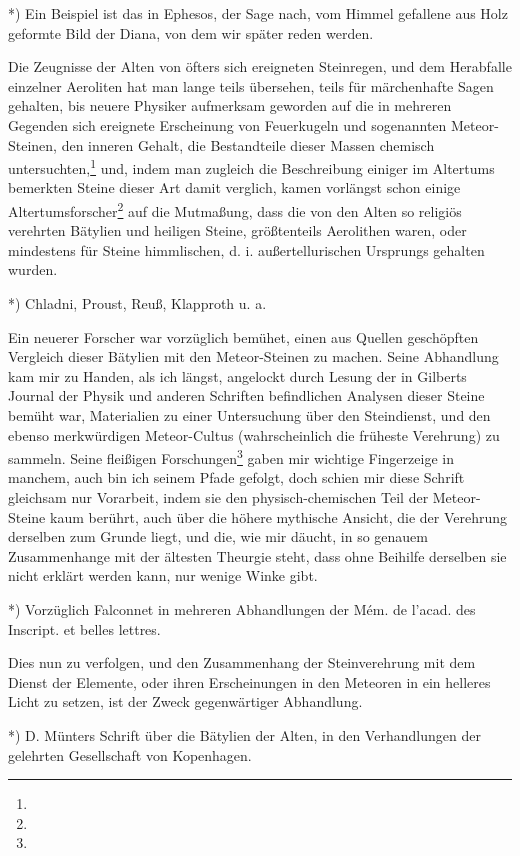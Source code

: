 \documentclass[a4paper, 11pt, oneside, polutonikogreek, german]{article}
\begin{document}
*) Ein Beispiel ist das in Ephesos, der Sage nach, vom Himmel gefallene aus Holz geformte Bild der Diana, von dem wir später reden werden.

Die Zeugnisse der Alten von öfters sich ereigneten Steinregen, und dem Herabfalle einzelner Aeroliten hat man lange teils übersehen, teils für märchenhafte Sagen gehalten, bis neuere Physiker aufmerksam geworden auf die in mehreren Gegenden sich ereignete Erscheinung von Feuerkugeln und sogenannten Meteor-Steinen, den inneren Gehalt, die Bestandteile dieser Massen chemisch untersuchten,\footnote{} und, indem man zugleich die Beschreibung einiger im Altertums bemerkten Steine dieser Art damit verglich, kamen vorlängst schon einige Altertumsforscher\footnote{} auf die Mutmaßung, dass die von den Alten so religiös verehrten Bätylien und heiligen Steine, größtenteils Aerolithen waren, oder mindestens für Steine himmlischen, d. i. außertellurischen Ursprungs gehalten wurden.

*) Chladni, Proust, Reuß, Klapproth u. a.

Ein neuerer Forscher war vorzüglich bemühet, einen aus Quellen geschöpften Vergleich dieser Bätylien mit den Meteor-Steinen zu machen. Seine Abhandlung kam mir zu Handen, als ich längst, angelockt durch Lesung der in Gilberts Journal der Physik und anderen Schriften befindlichen Analysen dieser Steine bemüht war, Materialien zu einer Untersuchung über den Steindienst, und den ebenso merkwürdigen Meteor-Cultus (wahrscheinlich die früheste Verehrung) zu sammeln. Seine fleißigen Forschungen\footnote{} gaben mir wichtige Fingerzeige in manchem, auch bin ich seinem Pfade gefolgt, doch schien mir diese Schrift gleichsam nur Vorarbeit, indem sie den physisch-chemischen Teil der Meteor-Steine kaum berührt, auch über die höhere mythische Ansicht, die der Verehrung derselben zum Grunde liegt, und die, wie mir däucht, in so genauem Zusammenhange mit der ältesten Theurgie steht, dass ohne Beihilfe derselben sie nicht erklärt werden kann, nur wenige Winke gibt.

*) Vorzüglich Falconnet in mehreren Abhandlungen der Mém. de l'acad. des Inscript. et belles lettres.

Dies nun zu verfolgen, und den Zusammenhang der Steinverehrung mit dem Dienst der Elemente, oder ihren Erscheinungen in den Meteoren in ein helleres Licht zu setzen, ist der Zweck gegenwärtiger Abhandlung.

*) D. Münters Schrift über die Bätylien der Alten, in den Verhandlungen der gelehrten Gesellschaft von Kopenhagen.
\end{document}

